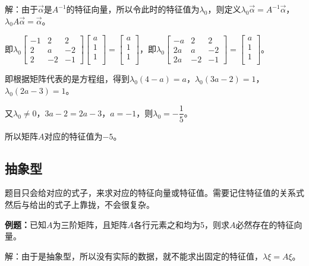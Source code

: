 \documentclass[UTF8, 12pt]{ctexart}
\begin{document}
解：由于$\overrightarrow{\alpha}$是$A^{-1}$的特征向量，所以令此时的特征值为$\lambda_0$，则定义$\lambda_0\overrightarrow{\alpha}=A^{-1}\overrightarrow{\alpha}$，$\lambda_0A\overrightarrow{\alpha}=\overrightarrow{\alpha}$。

即$\lambda_0\left[\begin{array}{ccc}
    -1 & 2 & 2 \\
    2 & a & -2 \\
    2 & -2 & -1
\end{array}\right]\left[\begin{array}{c}
    a \\
    1 \\
    1 \\
\end{array}\right]=\left[\begin{array}{c}
    a \\
    1 \\
    1 \\
\end{array}\right]$，即$\lambda_0\left[\begin{array}{ccc}
    -a & 2 & 2 \\
    2a & a & -2 \\
    2a & -2 & -1
\end{array}\right]=\left[\begin{array}{c}
    a \\
    1 \\
    1 \\
\end{array}\right]$。\medskip

即根据矩阵代表的是方程组，得到$\lambda_0(4-a)=a$，$\lambda_0(3a-2)=1$，$\lambda_0(2a-3)=1$。

又$\lambda_0\neq0$，$3a-2=2a-3$，$a=-1$，则$\lambda_0=-\dfrac{1}{5}$。

所以矩阵$A$对应的特征值为$-5$。

\subsection{抽象型}

题目只会给对应的式子，来求对应的特征向量或特征值。需要记住特征值的关系式然后与给出的式子上靠拢，不会很复杂。

\textbf{例题：}已知$A$为三阶矩阵，且矩阵$A$各行元素之和均为5，则求$A$必然存在的特征向量。

解：由于是抽象型，所以没有实际的数据，就不能求出固定的特征值，$\lambda\xi=A\xi$。
\end{document}
